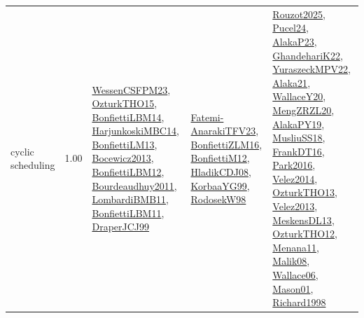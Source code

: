 {\begin{longtable}{p{3cm}r>{\raggedright\arraybackslash}p{6cm}>{\raggedright\arraybackslash}p{6cm}>{\raggedright\arraybackslash}p{8cm}}
\index{cyclic scheduling}\index{Concepts!cyclic scheduling}cyclic scheduling &  1.00 & \hyperref[detail:WessenCSFPM23]{WessenCSFPM23}, \hyperref[detail:OzturkTHO15]{OzturkTHO15}, \hyperref[detail:BonfiettiLBM14]{BonfiettiLBM14}, \hyperref[detail:HarjunkoskiMBC14]{HarjunkoskiMBC14}, \hyperref[detail:BonfiettiLM13]{BonfiettiLM13}, \hyperref[detail:Bocewicz2013]{Bocewicz2013}, \hyperref[detail:BonfiettiLBM12]{BonfiettiLBM12}, \hyperref[detail:Bourdeaudhuy2011]{Bourdeaudhuy2011}, \hyperref[detail:LombardiBMB11]{LombardiBMB11}, \hyperref[detail:BonfiettiLBM11]{BonfiettiLBM11}, \hyperref[detail:DraperJCJ99]{DraperJCJ99} & \hyperref[detail:Fatemi-AnarakiTFV23]{Fatemi-AnarakiTFV23}, \hyperref[detail:BonfiettiZLM16]{BonfiettiZLM16}, \hyperref[detail:BonfiettiM12]{BonfiettiM12}, \hyperref[detail:HladikCDJ08]{HladikCDJ08}, \hyperref[detail:KorbaaYG99]{KorbaaYG99}, \hyperref[detail:RodosekW98]{RodosekW98} & \hyperref[detail:Rouzot2025]{Rouzot2025}, \hyperref[detail:Pucel24]{Pucel24}, \hyperref[detail:AlakaP23]{AlakaP23}, \hyperref[detail:GhandehariK22]{GhandehariK22}, \hyperref[detail:YuraszeckMPV22]{YuraszeckMPV22}, \hyperref[detail:Alaka21]{Alaka21}, \hyperref[detail:WallaceY20]{WallaceY20}, \hyperref[detail:MengZRZL20]{MengZRZL20}, \hyperref[detail:AlakaPY19]{AlakaPY19}, \hyperref[detail:MusliuSS18]{MusliuSS18}, \hyperref[detail:FrankDT16]{FrankDT16}, \hyperref[detail:Park2016]{Park2016}, \hyperref[detail:Velez2014]{Velez2014}, \hyperref[detail:OzturkTHO13]{OzturkTHO13}, \hyperref[detail:Velez2013]{Velez2013}, \hyperref[detail:MeskensDL13]{MeskensDL13}, \hyperref[detail:OzturkTHO12]{OzturkTHO12}, \hyperref[detail:Menana11]{Menana11}, \hyperref[detail:Malik08]{Malik08}, \hyperref[detail:Wallace06]{Wallace06}, \hyperref[detail:Mason01]{Mason01}, \hyperref[detail:Richard1998]{Richard1998}\\

\end{longtable}}
